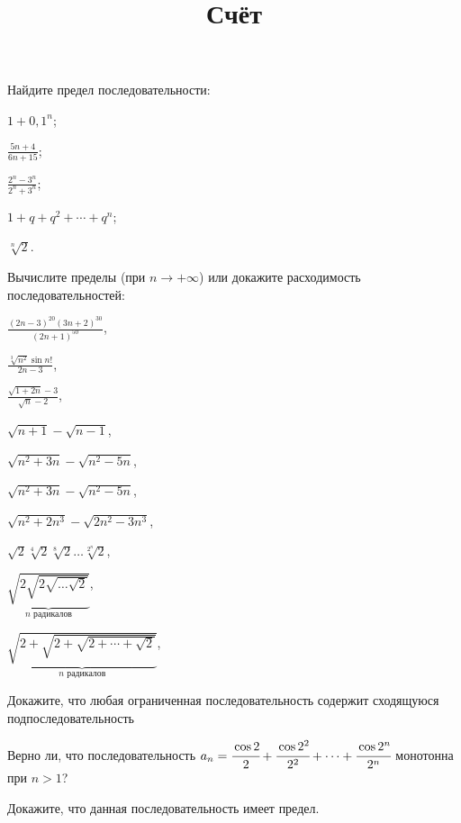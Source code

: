 \documentclass[a4paper, 12pt, num=31]{listok}
\begin{document}
\title{Счёт}
\maketitle{}
\begin{problem}
    Найдите предел последовательности:
    \begin{probparts}
        \item $1 + {0{,}1}^n$;
        \item $\frac{5n + 4}{6n + 15}$;
        \item $\frac{2^n - 3^n}{2^n + 3^n}$;
        \item $1 + q + q^2 + \cdots + q^n$;
        \item $\sqrt[n]{2}$.
    \end{probparts}
\end{problem}
\begin{problem}
    Вычислите пределы (при $n \to + \infty$) или докажите расходимость последовательностей:
    \begin{probparts}
        \item $\frac{{(2n - 3)}^{20} {(3n + 2)}^{30}}{{(2n + 1)}^{50}}$,
        \item $\frac{\sqrt[3]{n^2}\sin{n!}}{2n - 3}$,
        \item $\frac{\sqrt{1 + 2n} - 3}{\sqrt n - 2}$,
        \item $\sqrt{n + 1} - \sqrt{n - 1}$,
        \item $\sqrt{n^2 + 3n} - \sqrt{n^2 - 5n}$,
        \item $\sqrt{n^2 + 3n} - \sqrt{n^2 - 5n}$,
        \item $\sqrt{n^2 + 2n^3} - \sqrt{2n^2 - 3n^3}$,
        \item $\sqrt2\sqrt[4]2\sqrt[8]2\dots\sqrt[2^n]2$,
        \item $\underbrace{\sqrt{2\sqrt{2\sqrt{\dots\sqrt 2}}}}_{\text{$n$ радикалов}}$,
        \item $\underbrace{\sqrt{2 + \sqrt{2 + \sqrt{2 + \cdots + \sqrt 2}}}}_{\text{$n$ радикалов}}$,
    \end{probparts}
\end{problem}
\begin{problem}[(у)]
    Докажите, что любая ограниченная последовательность содержит сходящуюся подпоследовательность
\end{problem}
\begin{problem}
\begin{probparts}
    \item Верно ли, что последовательность $a_n = \cfrac{\cos2}2 + \cfrac{\cos 2^2}{2^2} + \cdots + \cfrac{\cos 2^n}{2^n}$ монотонна при $n > 1$?
    \item Докажите, что данная последовательность имеет предел.
\end{probparts}
\end{problem}
\end{document}
